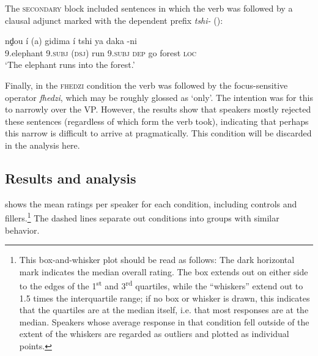 \documentclass[output=paper,modfonts,nonflat,draftmode]{langsci/langscibook}
\begin{document}
The \textsc{secondary} block included sentences in which the verb was followed
by a clausal adjunct marked with the dependent prefix \textit{tshi-}
(\citealt{Warmelo1989}):


\ea \label{ex:kusmer:secondary}
\gll  nḓou í (a) gidima í tshi ya daka -ni\\
	9.elephant 9.\textsc{subj} (\textsc{dsj}) run 9.\textsc{subj} \textsc{dep}
	go forest \textsc{loc}\\
	\glt  `The elephant runs into the forest.'
 \z


Finally, in the \textsc{fhedzi} condition the verb was followed by the
focus-sensitive operator \textit{fhedzi}, which may be roughly glossed as
`only'. The intention was for this to narrowly  over the VP. However, the
results show that speakers mostly rejected these sentences (regardless of which
form the verb took), indicating that perhaps this narrow  is difficult to
arrive at pragmatically. This condition will be discarded in the
analysis here.


\subsection{Results and analysis}

 shows the mean ratings per speaker for each
condition, including controls and fillers.\footnote{This box-and-whisker plot
	should be read as follows: The dark horizontal mark indicates the median
	overall rating. The box extends out on either side to the edges of the
	1\textsuperscript{st} and 3\textsuperscript{rd} quartiles, while the
	``whiskers'' extend out to 1.5 times the interquartile range; if no box or
	whisker is drawn, this indicates that the quartiles are at the median
itself, i.e.  that most responses are at the median.  Speakers whose
average response in that condition fell  outside of the extent of the whiskers
are regarded as outliers and plotted as individual points.} The dashed lines
separate out conditions into groups with similar behavior.

\end{document}
